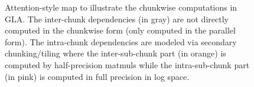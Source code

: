\begin{figure}[t]
\begin{tikzpicture}[x=0.2cm, y=0.2cm]
%
    \end{tikzpicture}
\vspace{-2mm}
    \caption{
    Attention-style map to illustrate the chunkwise computations in GLA. The inter-chunk dependencies (in gray) 
    are not directly computed in the chunkwise form (only computed in the parallel form).
    The intra-chunk dependencies are modeled via secondary chunking/tiling where the inter-sub-chunk part (in orange) is computed by half-precision matmuls while the intra-sub-chunk part (in pink) is computed in full precision in log space. 
    }
    \label{fig:gla_tiling}

\end{figure}
